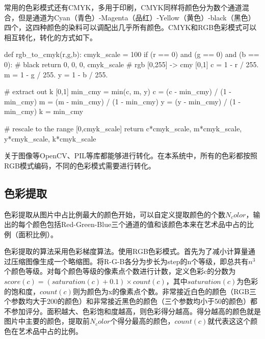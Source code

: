 常用的色彩模式还有CMYK，多用于印刷，CMYK同样将颜色分为数个通道混合，但是通道为Cyan（青色）-Magenta（品红）-Yellow（黄色）-black（黑色）四个，这四种颜色的染料可以调配出几乎所有颜色。CMYK和RGB色彩模式可以相互转化，转化的方式如下。

\begin{python}
def rgb_to_cmyk(r,g,b):
	cmyk_scale = 100
    if (r == 0) and (g == 0) and (b == 0):
        # black
        return 0, 0, 0, cmyk_scale
    # rgb [0,255] -> cmy [0,1]
    c = 1 - r / 255.
    m = 1 - g / 255.
    y = 1 - b / 255.

    # extract out k [0,1]
    min_cmy = min(c, m, y)
    c = (c - min_cmy) / (1 - min_cmy)
    m = (m - min_cmy) / (1 - min_cmy)
    y = (y - min_cmy) / (1 - min_cmy)
    k = min_cmy

    # rescale to the range [0,cmyk_scale]
    return c*cmyk_scale, m*cmyk_scale, y*cmyk_scale, k*cmyk_scale
\end{python}

关于图像等OpenCV、PIL等库都能够进行转化。在本系统中，所有的色彩都按照RGB模式编码，不同的色彩模式需要进行转化。

\subsection{色彩提取}

色彩提取从图片中占比例最大的颜色开始，可以自定义提取颜色的个数$N_color$，输出的每个颜色包括Red-Green-Blue三个通道的值和该颜色本来在艺术品中占的比例（面积比例）。

色彩提取的算法采用色彩梯度算法。使用RGB色彩模式。首先为了减小计算量通过压缩图像生成一个略缩图。将R-G-B各分为步长为step的n个等级，即总共有$n^3$个颜色等级。对每个颜色等级的像素点个数进行计数，定义色彩c的分数为$score(c) = (saturation(c) + 0.1) \times count(c) $，其中$saturation(c)$为色彩的饱和度，$count(c)$则为颜色为x的像素点个数。非常接近白色的颜色（RGB三个参数均大于200的颜色）和非常接近黑色的颜色（三个参数均小于50的颜色）都不参加评分。面积越大、色彩饱和度越高，则色彩得分越高。得分越高的颜色就是图片中主要的颜色，提取前$N_color$个得分最高的颜色，$count(c)$就代表这这个颜色在艺术品中占的比例。

